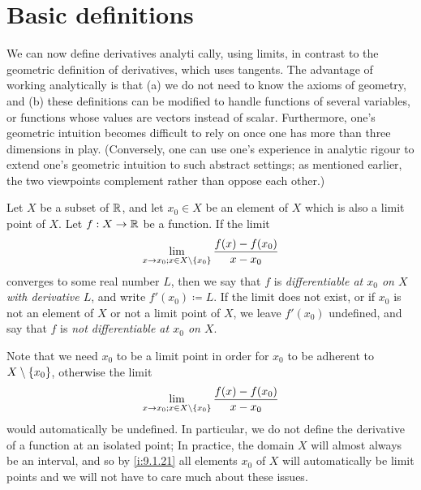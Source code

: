 \section{Basic definitions}\label{i:sec:10}

\begin{note}
  We can now define derivatives analyti cally, using limits, in contrast to the geometric definition of derivatives, which uses tangents.
  The advantage of working analytically is that
  (a) we do not need to know the axioms of geometry, and
  (b) these definitions can be modified to handle functions of several variables, or functions whose values are vectors instead of scalar.
  Furthermore, one's geometric intuition becomes difficult to rely on once one has more than three dimensions in play.
  (Conversely, one can use one's experience in analytic rigour to extend one's geometric intuition to such abstract settings;
  as mentioned earlier, the two viewpoints complement rather than oppose each other.)
\end{note}

\begin{defn}\label{i:10.1.1}
  Let \(X\) be a subset of \(\mathbb{R}\), and let \(x_0 \in X\) be an element of \(X\) which is also a limit point of \(X\).
  Let \(f : X \to \mathbb{R}\) be a function.
  If the limit
  \[
    \lim_{x \to x_0 ; x \in X \setminus \left\lbrace x_0\right\rbrace} \dfrac{f(x) - f(x_0)}{x - x_0}
  \]
  converges to some real number \(L\), then we say that \(f\) is \emph{differentiable at \(x_0\) on \(X\) with derivative \(L\)}, and write \(f'(x_0) \coloneqq L\).
  If the limit does not exist, or if \(x_0\) is not an element of \(X\) or not a limit point of \(X\), we leave \(f'(x_0)\) undefined, and say that \(f\) is \emph{not differentiable at \(x_0\) on \(X\)}.
\end{defn}

\begin{rmk}\label{i:10.1.2}
  Note that we need \(x_0\) to be a limit point in order for \(x_0\) to be adherent to \(X \setminus \left\lbrace x_0\right\rbrace\), otherwise the limit
  \[
    \lim_{x \to x_0 ; x \in X \setminus \left\lbrace x_0\right\rbrace} \dfrac{f(x) - f(x_0)}{x - x_0}
  \]
  would automatically be undefined.
  In particular, we do not define the derivative of a function at an isolated point;
  In practice, the domain \(X\) will almost always be an interval, and so by \cref{i:9.1.21} all elements \(x_0\) of \(X\) will automatically be limit points and we will not have to care much about these issues.
\end{rmk}

